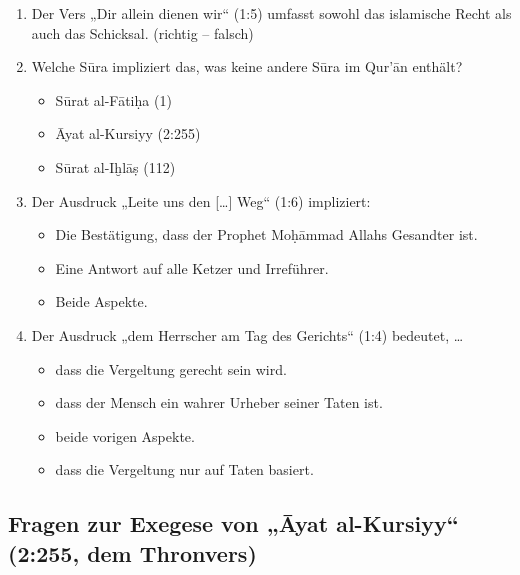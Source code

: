 \begin{enumerate}[leftmargin=1.6em]
  (1:7) bezieht, sind:
  \begin{itemize}
    \item Alle Gläubigen in dieser Gemeinschaft.
    \item Alle Propheten, aufrichtigen Gefährten, Märtyrer und Rechtschaffenen, denen Allah
      Seine Gunst erwiesen hat.
  \end{itemize}
\item Der Vers „Dir allein dienen wir“ (1:5) umfasst sowohl das islamische Recht als auch das
  Schicksal. (richtig -- falsch)
\item Welche Sūra impliziert das, was keine andere Sūra im Qur’ān enthält?
  \begin{itemize}
    \item Sūrat al-Fātiḥa (1)
    \item Āyat al-Kursiyy (2:255)
    \item Sūrat al-Iḫlāṣ (112)
  \end{itemize}
\item Der Ausdruck „Leite uns den [\ldots{}] Weg“ (1:6) impliziert:
  \begin{itemize}
    \item Die Bestätigung, dass der Prophet Moḥāmmad Allahs Gesandter ist.
    \item Eine Antwort auf alle Ketzer und Irreführer.
    \item Beide Aspekte.
  \end{itemize}
\item Der Ausdruck „dem Herrscher am Tag des Gerichts“ (1:4) bedeutet, \ldots
  \begin{itemize}
    \item dass die Vergeltung gerecht sein wird.
    \item dass der Mensch ein wahrer Urheber seiner Taten ist.
    \item beide vorigen Aspekte.
    \item dass die Vergeltung nur auf Taten basiert.
  \end{itemize}
\end{enumerate}

\subsection*{Fragen zur Exegese von „Āyat al-Kursiyy“ (2:255, dem Thronvers)}


